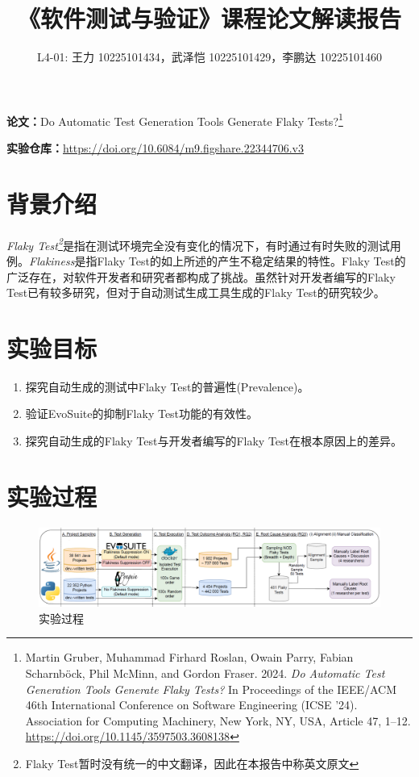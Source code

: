 \documentclass{article}
\title{\heiti\textbf{《软件测试与验证》课程论文解读报告}}
\author{L4-01: 王力 {\small 10225101434}，武泽恺 {\small 10225101429}，李鹏达 {\small 10225101460}}
\date{}
\newcommand{\flakyTest}{Flaky Test}
\begin{document}
\maketitle
\noindent \textbf{\heiti 论\qquad 文：}Do Automatic Test Generation Tools Generate Flaky Tests?\footnote{Martin Gruber, Muhammad Firhard Roslan, Owain Parry, Fabian Scharnböck, Phil McMinn, and Gordon Fraser. 2024. \textit{Do Automatic Test Generation Tools Generate Flaky Tests?} In Proceedings of the IEEE/ACM 46th International Conference on Software Engineering (ICSE '24). Association for Computing Machinery, New York, NY, USA, Article 47, 1–12. \url{https://doi.org/10.1145/3597503.3608138}}

\noindent \textbf{\heiti 实验仓库：}\small\url{https://doi.org/10.6084/m9.figshare.22344706.v3}

\section{背景介绍}
\textit{\flakyTest\footnote{Flaky Test暂时没有统一的中文翻译，因此在本报告中称英文原文}}是指在测试环境完全没有变化的情况下，有时通过有时失败的测试用例。\textit{Flakiness}是指\flakyTest 的如上所述的产生不稳定结果的特性。\flakyTest 的广泛存在，对软件开发者和研究者都构成了挑战。虽然针对开发者编写的\flakyTest 已有较多研究，但对于自动测试生成工具生成的\flakyTest 的研究较少。

\section{实验目标}

\begin{enumerate}[label=(\arabic*),noitemsep]
    \item 探究自动生成的测试中\flakyTest 的普遍性(Prevalence)。
    \item 验证EvoSuite的抑制\flakyTest 功能的有效性。
    \item 探究自动生成的\flakyTest 与开发者编写的\flakyTest 在根本原因上的差异。
\end{enumerate}

\section{实验过程}

\begin{figure}[htbp]
    \centering
    \includegraphics[width=\textwidth]{img/steps.png}
    \caption{实验过程}
    \label{fig:steps}
\end{figure}
\end{document}
